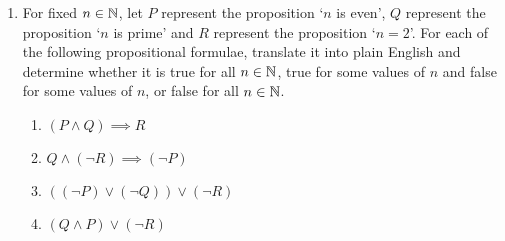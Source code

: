 \documentclass[12pt]{amsart}
\begin{document}
\begin{enumerate}[label=\arabic*.,itemsep=10pt, leftmargin=*]
\item  
    For fixed $n\in \mathbb{N}$, let $P$ represent the proposition 
    `$n$ is even', $Q$ represent the proposition `$n$ is prime' and
    $R$ represent the proposition `$n = 2$'. 
    For each of the following propositional formulae, translate
    it into plain English and determine whether it is true for all 
    $n\in \mathbb{N}$, true for some values of $n$ and false for some values 
    of $n$, or false for all $n\in \mathbb{N}$.
    \begin{enumerate}[label=\alph*.,itemsep=5pt, leftmargin=*]
        \item $(P \wedge Q) \implies R$
        \item $ Q \wedge (\neg R) \implies (\neg P)$
        \item $ ((\neg P) \vee (\neg Q)) \vee (\neg R)$
        \item $ (Q \wedge P) \vee (\neg R)$
    \end{enumerate}




\end{enumerate}
\end{document}
